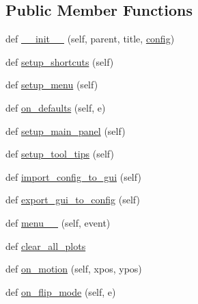 \subsection*{Public Member Functions}
\begin{DoxyCompactItemize}
\item 
def \hyperlink{class_uni_dec_1_1unidec__modules_1_1mainwindow_1_1_mainwindow_ab854ca6e4c994de7f2ef52256112cd64}{\+\_\+\+\_\+init\+\_\+\+\_\+} (self, parent, title, \hyperlink{class_uni_dec_1_1unidec__modules_1_1mainwindow_1_1_mainwindow_adf6499eda6de1678facb8189124ceace}{config})
\item 
def \hyperlink{class_uni_dec_1_1unidec__modules_1_1mainwindow_1_1_mainwindow_a81eaf6d9e19fa5d0990faa0e41017439}{setup\+\_\+shortcuts} (self)
\item 
def \hyperlink{class_uni_dec_1_1unidec__modules_1_1mainwindow_1_1_mainwindow_aab7b2d8e0d75d20040f2d036123a5473}{setup\+\_\+menu} (self)
\item 
def \hyperlink{class_uni_dec_1_1unidec__modules_1_1mainwindow_1_1_mainwindow_a36ab3b6496530c6d44bdc8b57a6b3a6a}{on\+\_\+defaults} (self, e)
\item 
def \hyperlink{class_uni_dec_1_1unidec__modules_1_1mainwindow_1_1_mainwindow_adfd43ae134824504a3e14d49c59717f7}{setup\+\_\+main\+\_\+panel} (self)
\item 
def \hyperlink{class_uni_dec_1_1unidec__modules_1_1mainwindow_1_1_mainwindow_a2cdfbd7e7b4b22f820eeb25dadb3052a}{setup\+\_\+tool\+\_\+tips} (self)
\item 
def \hyperlink{class_uni_dec_1_1unidec__modules_1_1mainwindow_1_1_mainwindow_a8900e969df680403ab3c8f7c0aa3e12a}{import\+\_\+config\+\_\+to\+\_\+gui} (self)
\item 
def \hyperlink{class_uni_dec_1_1unidec__modules_1_1mainwindow_1_1_mainwindow_a7ec29418a4262baf47c6dabc3b404c92}{export\+\_\+gui\+\_\+to\+\_\+config} (self)
\item 
def \hyperlink{class_uni_dec_1_1unidec__modules_1_1mainwindow_1_1_mainwindow_aaea13dbb2e56caea46f8a68339845e09}{menu\+\_\+\_} (self, event)
\item 
def \hyperlink{class_uni_dec_1_1unidec__modules_1_1mainwindow_1_1_mainwindow_a108b2e9196cf6b76369cb6054baa1670}{clear\+\_\+all\+\_\+plots}
\item 
def \hyperlink{class_uni_dec_1_1unidec__modules_1_1mainwindow_1_1_mainwindow_a1d55c1e270b97694555f916f8c4ab0cb}{on\+\_\+motion} (self, xpos, ypos)
\item 
def \hyperlink{class_uni_dec_1_1unidec__modules_1_1mainwindow_1_1_mainwindow_abf8fafe7c899f6b9102cb1633967d4e8}{on\+\_\+flip\+\_\+mode} (self, e)

\end{DoxyCompactItemize}
